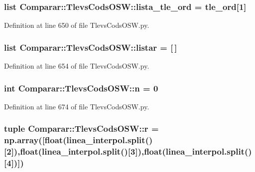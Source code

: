 \subsubsection[{lista\-\_\-tle\-\_\-ord}]{\setlength{\rightskip}{0pt plus 5cm}list {\bf \-Comparar\-::\-Tlevs\-Cods\-O\-S\-W\-::lista\-\_\-tle\-\_\-ord} = {\bf tle\-\_\-ord}[1]}\label{namespace_comparar_1_1_tlevs_cods_o_s_w_a9fef17d7d75b265e9225754672197bb9}


\-Definition at line 650 of file \-Tlevs\-Cods\-O\-S\-W.\-py.

\subsubsection[{listar}]{\setlength{\rightskip}{0pt plus 5cm}list {\bf \-Comparar\-::\-Tlevs\-Cods\-O\-S\-W\-::listar} = [$\,$]}\label{namespace_comparar_1_1_tlevs_cods_o_s_w_a9433da424e0f606225111d856804ce53}


\-Definition at line 654 of file \-Tlevs\-Cods\-O\-S\-W.\-py.

\subsubsection[{n}]{\setlength{\rightskip}{0pt plus 5cm}int {\bf \-Comparar\-::\-Tlevs\-Cods\-O\-S\-W\-::n} = 0}\label{namespace_comparar_1_1_tlevs_cods_o_s_w_a3992130f41fc449ce600a45bb9ac4a11}


\-Definition at line 674 of file \-Tlevs\-Cods\-O\-S\-W.\-py.

\subsubsection[{r}]{\setlength{\rightskip}{0pt plus 5cm}tuple {\bf \-Comparar\-::\-Tlevs\-Cods\-O\-S\-W\-::r} = np.\-array([float(linea\-\_\-interpol.\-split()[2]),float(linea\-\_\-interpol.\-split()[3]),float(linea\-\_\-interpol.\-split()[4])])}\label{namespace_comparar_1_1_tlevs_cods_o_s_w_ae6320a32b24556b0740d386d1e4af0b6}


